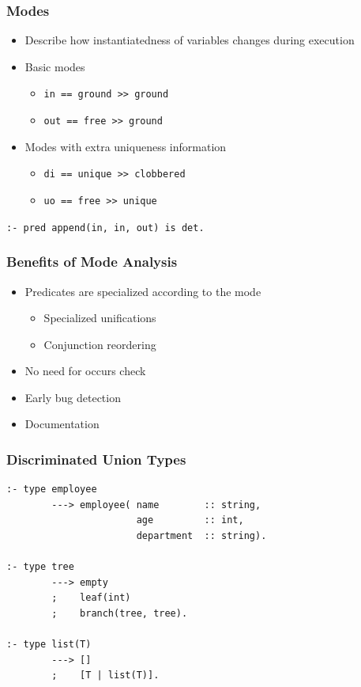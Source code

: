 \documentclass{beamer}
\begin{document}
\begin{frame}[fragile]
  \frametitle{Modes}
  \begin{itemize}
    \item Describe how instantiatedness of variables changes during execution
    \item Basic modes
    \begin{itemize}
      \item \texttt{in == ground >> ground}
      \item \texttt{out == free >> ground}
    \end{itemize}
    \item Modes with extra uniqueness information
    \begin{itemize}
      \item \texttt{di == unique >> clobbered}
      \item \texttt{uo == free >> unique}
    \end{itemize}

  \end{itemize}

\vspace{0.5cm}

  \begin{center}
    \texttt{:- pred append(in, in, out) is det.}
  \end{center}
\end{frame}


\begin{frame}[fragile]
  \frametitle{Benefits of Mode Analysis}
\begin{itemize}
  \item Predicates are specialized according to the mode
  \begin{itemize}
    \item Specialized unifications
    \item Conjunction reordering
  \end{itemize}
  \item No need for occurs check
  \item Early bug detection
  \item Documentation
\end{itemize}
\end{frame}

\begin{frame}[fragile]
  \frametitle{Discriminated Union Types}

\begin{lstlisting}
:- type employee
        ---> employee( name        :: string,
                       age         :: int,
                       department  :: string).

:- type tree
        ---> empty
        ;    leaf(int)
        ;    branch(tree, tree).

:- type list(T)
        ---> []
        ;    [T | list(T)].
\end{lstlisting}

\end{frame}
\end{document}
